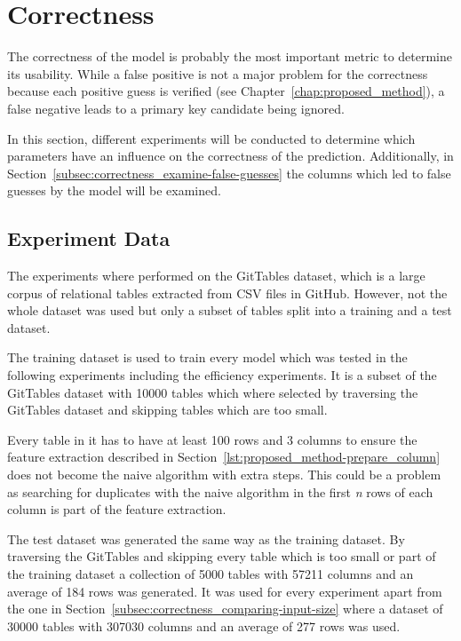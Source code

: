 \section{Correctness}\label{sec:correctness}
The correctness of the model is probably the most important metric to determine its usability. While a false positive is not a major problem for the correctness because each positive guess is verified (see Chapter~\ref{chap:proposed_method}), a false negative leads to a primary key candidate being ignored.

In this section, different experiments will be conducted to determine which parameters have an influence on the correctness of the prediction. Additionally, in Section~\ref{subsec:correctness_examine-false-guesses} the columns which led to false guesses by the model will be examined.


\subsection{Experiment Data}\label{subsec:correctness_experiment-data}
The experiments where performed on the GitTables dataset, which is a large corpus of relational tables extracted from CSV files in GitHub\cite{gittables-article}. However, not the whole dataset was used but only a subset of tables split into a training and a test dataset.

The training dataset is used to train every model which was tested in the following experiments including the efficiency experiments. It is a subset of the GitTables dataset with \num{10000} tables which where selected by traversing the GitTables dataset and skipping tables which are too small.

Every table in it has to have at least \num{100} rows and \num{3} columns to ensure the feature extraction described in Section~\ref{lst:proposed_method-prepare_column} does not become the naive algorithm with extra steps. This could be a problem as searching for duplicates with the naive algorithm in the first \textit{n} rows of each column is part of the feature extraction.

The test dataset was generated the same way as the training dataset. By traversing the GitTables and skipping every table which is too small or part of the training dataset a collection of \num{5000} tables with \num{57211} columns and an average of \num{184} rows was generated. It was used for every experiment apart from the one in Section~\ref{subsec:correctness_comparing-input-size} where a dataset of \num{30000} tables with \num{307030} columns and an average of \num{277} rows was used.


